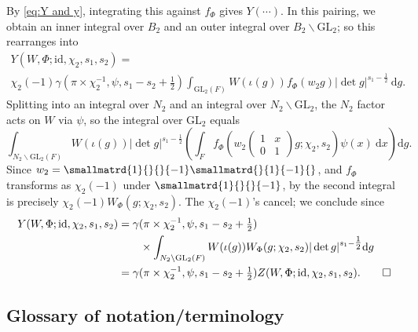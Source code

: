 \documentclass[10pt,reqno,a4paper]{amsart}
\newcommand{\stbt}[4]{\left(\begin{smallmatrix}#1 & #2\\#3&#4\end{smallmatrix}\right)}
\newcommand{\GL}{\mathrm{GL}}
\begin{document}
By \eqref{eq:Y and y}, integrating this against $f_{\Phi}$ gives $Y(\cdots)$. In this pairing, we obtain an inner integral over $B_2$ and an outer integral over $B_2 \backslash \GL_2$; so this rearranges into
\begin{multline*}
Y(W, \Phi; \mathrm{id}, \chi_2, s_1, s_2) = \\
\chi_2(-1)\gamma(\pi \times \chi_2^{-1},\psi, s_1 - s_2 + \tfrac{1}{2}) \int_{\GL_2(F)} W(\iota(g))f_{\Phi}(w_2 g) |\det g|^{s_1-\tfrac{1}{2}}\ \mathrm{d}g.
\end{multline*}
Splitting into an integral over $N_2$ and an integral over $N_2 \backslash \GL_2$, the $N_2$ factor acts on $W$ via $\psi$, so the integral over $\GL_2$ equals
\[
\int_{N_2 \backslash \GL_2(F)} W(\iota(g)) |\det g|^{s_1-\tfrac{1}{2}} \left(\int_F f_{\Phi}(w_2 \stbt 1 x 0 1 g; \chi_2, s_2) \psi(x)\ \mathrm{d}x\right)\mathrm{d}g.
\]
Since $w_2 = \smallmatrd{1}{}{}{-1}\smallmatrd{}{1}{-1}{}$, and $f_{\Phi}$ transforms as $\chi_2(-1)$ under $\smallmatrd{1}{}{}{-1}$, by \cite[\S8.1]{LPSZ19} the second integral is precisely $\chi_2(-1)W_\Phi(g;\chi_2,s_2)$. The $\chi_2(-1)$'s cancel; we conclude since
\begin{align*}
Y(W, \Phi; \mathrm{id}, \chi_2, s_1, s_2) &= \gamma(\pi \times \chi_2^{-1},\psi, s_1 - s_2 + \tfrac{1}{2})\\
&\hspace{20pt}  \times \int_{N_2 \backslash \GL_2(F)} W(\iota(g))  W_\Phi(g; \chi_2,s_2) |\det g|^{s_1-\tfrac{1}{2}}\mathrm{d}g\\
&=  \gamma(\pi \times \chi_2^{-1},\psi, s_1 - s_2 + \tfrac{1}{2})  Z(W, \Phi; \mathrm{id}, \chi_2, s_1, s_2).
\qed\end{align*}


\subsection*{Glossary of notation/terminology}
\end{document}
